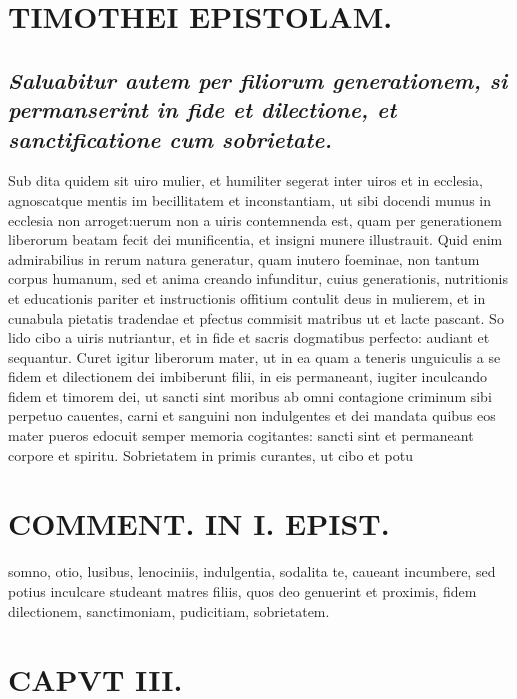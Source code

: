 \documentclass{article}
\begin{document}
\begin{pages}
\section*{TIMOTHEI EPISTOLAM. }
\marginpar{[ p.63 ]}
{}
\subsection*{\textit{Saluabitur autem per filiorum generationem, si permanserint in fide et dilectione, et sanctificatione cum sobrietate. }}\pstart Sub dita quidem sit uiro mulier, et humiliter segerat inter uiros et in ecclesia, agnoscatque mentis im becillitatem et inconstantiam, ut sibi docendi munus in ecclesia non arroget:uerum non a uiris contemnenda est, quam per generationem liberorum beatam fecit dei munificentia, et insigni munere illustrauit. Quid enim admirabilius in rerum natura generatur, quam inutero foeminae, non tantum corpus humanum, sed et anima creando infunditur, cuius generationis, nutritionis et educationis pariter et instructionis offitium contulit deus in mulierem, et in cunabula pietatis tradendae et pfectus commisit matribus ut et lacte pascant. So lido cibo a uiris nutriantur, et in fide et sacris dogmatibus perfecto: audiant et sequantur. Curet igitur liberorum mater, ut in ea quam a teneris unguiculis a se fidem et dilectionem dei imbiberunt filii, in eis permaneant, iugiter inculcando fidem et timorem dei, ut sancti sint moribus ab omni contagione criminum sibi perpetuo cauentes, carni et sanguini non indulgentes et dei mandata quibus eos mater pueros edocuit semper memoria cogitantes: sancti sint et permaneant corpore et spiritu. Sobrietatem in primis curantes, ut cibo et potu  \pend
\section*{COMMENT. IN I. EPIST. }
\marginpar{[ p.64 ]}\pstart somno, otio, lusibus, lenociniis, indulgentia, sodalita te, caueant incumbere, sed potius inculcare studeant matres filiis, quos deo genuerint et proximis, fidem dilectionem, sanctimoniam, pudicitiam, sobrietatem.  \pend
\endnumbering\beginnumbering\section{CAPVT III.}
{}

\end{pages}
\end{document}
